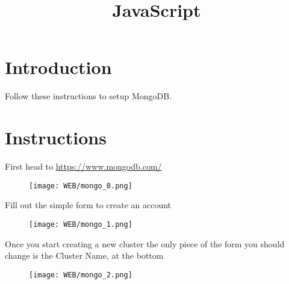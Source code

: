 \documentclass{42-en}
\begin{document}
\title{JavaScript}
\maketitle

\tableofcontents

\chapter{Introduction}

Follow these instructions to setup MongoDB.

\chapter{Instructions}

First head to \href{https://www.mongodb.com/}{https://www.mongodb.com/}

\begin{figure}[H]
    \begin{center}
        \texttt{[image: WEB/mongo\_0.png]}
    \end{center}
\end{figure}

Fill out the simple form to create an account
\begin{figure}[H]
    \begin{center}
        \texttt{[image: WEB/mongo\_1.png]}
    \end{center}
\end{figure}

\newpage
Once you start creating a new cluster the only piece of the form you should change is the Cluster Name, at the bottom
\begin{figure}[H]
    \begin{center}
        \texttt{[image: WEB/mongo\_2.png]}
    \end{center}
\end{figure}
\end{document}
